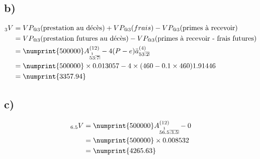 \documentclass[11pt,french]{report}
\makeatletter
\DeclareRobustCommand{\annuity}[1]{%
\def\arraystretch{0}%
\setlength\arraycolsep{.7pt}%
\setlength\arrayrulewidth{.3pt}%
\begin{array}[b]{@{}c|}\hline
\\[\arraycolsep]%
\scriptstyle #1%
\end{array}%
}
\newcommand{\indiceGauche}[2]{{\vphantom{#2}}_{#1}#2}
\makeatother
\begin{document}
\subsection*{b)}
\begin{align*}
\indiceGauche{3}{V} &= VP_{@3}(\text{prestation au décès}) + VP_{@3}(frais) - VP_{@3}(\text{primes à recevoir}) \\
&= VP_{@3}(\text{prestation futures au décès}) - VP_{@3}(\text{primes à recevoir - frais futures}) \\
&= \numprint{500000} A_{\overset{1}{53} \annuity{:7}}^{(12)} - 4(P-e)\ddot{a}_{53 \annuity{:2}}^{(4)}\\
&= \numprint{500000} \times 0.013057 - 4 \times (460-0.1 \times 460) 1.91446 \\
&= \numprint{3357.94}
\end{align*}
\subsection*{c)}
\begin{align*}
\indiceGauche{6.5}{V} &= \numprint{500000} A_{\overset{1}{56.5} \annuity{:3.5}}^{(12)} - 0\\
&= \numprint{500000} \times 0.008532 \\
&= \numprint{4265.63}
\end{align*}
\end{document}
